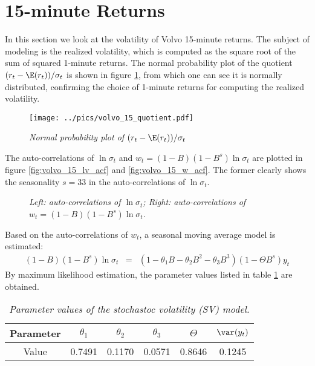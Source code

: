 \section{15-minute Returns}\label{sec:volvo_15}
In this section we look at the volatility of Volvo 15-minute
returns. The subject of modeling is the realized volatility, which is
computed as the square root of the sum of squared 1-minute
returns. The normal probability plot of the quotient $(r_t -
\E(r_t))/\sigma_t$ is shown in figure \ref{fig:volvo_15_quotient},
from which one can see it is normally distributed, confirming the
choice of 1-minute returns for computing the realized volatility.
\begin{figure}[htb!]
  \centering
  \texttt{[image: ../pics/volvo\_15\_quotient.pdf]}
  \caption{\small \it Normal probability plot of $(r_t -
    \E(r_t))/\sigma_t$}
  \label{fig:volvo_15_quotient}
\end{figure}
The auto-correlations of $\ln \sigma_t$ and $w_t = (1-B)(1-B^s) \ln
\sigma_t$ are plotted in figure \ref{fig:volvo_15_lv_acf} and
\ref{fig:volvo_15_w_acf}. The former clearly shows the seasonality
$s = 33$ in the auto-correlations of $\ln \sigma_t$.
\begin{figure}[htb!]
  \centering
  \caption{\small \it Left: auto-correlations of $\ln \sigma_t$;
    Right: auto-correlations of $w_t = (1-B)(1-B^s) \ln \sigma_t$.}
\end{figure}
Based on the auto-correlations of $w_t$, a seasonal moving average
model is estimated:
\begin{eqnarray*}
  (1-B)(1-B^s) \ln\sigma_t &=& (1-\theta_1B - \theta_2B^2 - \theta_3
  B^3)(1 - \Theta B^s)y_t
\end{eqnarray*}
By maximum likelihood estimation, the parameter values listed in table
\ref{tab:volvo_15_sv_param} are obtained.
\begin{table}[htb!]
  \centering
  \begin{tabular}{|c|c|c|c|c|c|}
  \hline
  Parameter & $\theta_1$ & $\theta_2$ & $\theta_3$ & $\Theta$ & 
 $\var(y_t)$ \\
 \hline
 Value & 0.7491 & 0.1170 & 0.0571 & 0.8646 & 0.1245 \\
  \hline
  \end{tabular}
  \caption{\small \it Parameter values of the stochastoc volatility
    (SV) model.}
  \label{tab:volvo_15_sv_param}
\end{table}

